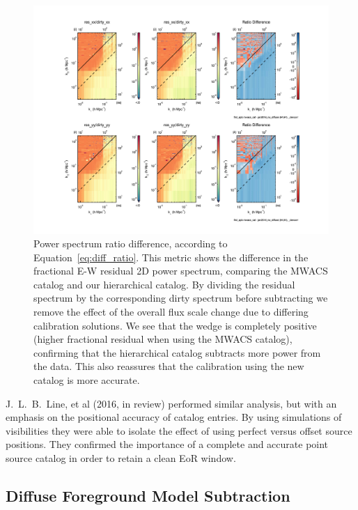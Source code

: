 \documentclass[iop]{emulateapj}
\begin{document}
\begin{figure}
\includegraphics[width=\columnwidth]{mwacs_ratio.pdf}
\caption{Power spectrum ratio difference, according to Equation~\ref{eq:diff_ratio}. This 
metric shows the difference in the fractional E-W residual 2D power spectrum, comparing 
the MWACS catalog and our hierarchical catalog. By dividing the residual spectrum by the 
corresponding dirty spectrum before subtracting we remove the effect of the overall flux 
scale change due to differing calibration solutions. We see that the wedge is completely 
positive (higher fractional residual when using the MWACS catalog), confirming that the 
hierarchical catalog subtracts more power from the data. This also reassures that the 
calibration using the new catalog is more accurate. 
\label{fig:mwacs_ratio}
}
\end{figure}

J.~L.~B.~Line, et al (2016, in review) performed similar analysis, but with an emphasis on the
positional accuracy of catalog entries. By using simulations of visibilities they were able to 
isolate the effect of using perfect versus offset source positions. They confirmed the
importance of a complete and accurate point source catalog in order to retain a clean EoR
window.

\subsection{Diffuse Foreground Model Subtraction}
\end{document}
